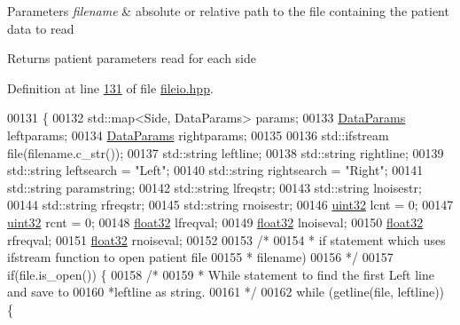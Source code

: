 \begin{DoxyParams}{Parameters}
{\em filename} & absolute or relative path to the file containing the patient data to read\\
\hline
\end{DoxyParams}
\begin{DoxyReturn}{Returns}
patient parameters read for each side 
\end{DoxyReturn}


Definition at line \hyperlink{fileio_8hpp_source_l00131}{131} of file \hyperlink{fileio_8hpp_source}{fileio.\+hpp}.


\begin{DoxyCode}
00131                                                        \{
00132         std::map<Side, DataParams> params;
00133         \hyperlink{structDataParams}{DataParams} leftparams;
00134         \hyperlink{structDataParams}{DataParams} rightparams;
00135 
00136         std::ifstream file(filename.c\_str());
00137         std::string leftline;
00138         std::string rightline;
00139         std::string leftsearch = \textcolor{stringliteral}{"Left"};
00140         std::string rightsearch = \textcolor{stringliteral}{"Right"};
00141         std::string paramstring;
00142         std::string lfreqstr;
00143         std::string lnoisestr;
00144         std::string rfreqstr;
00145         std::string rnoisestr;
00146         \hyperlink{definitions_8hpp_a1134b580f8da4de94ca6b1de4d37975e}{uint32} lcnt = 0;
00147         \hyperlink{definitions_8hpp_a1134b580f8da4de94ca6b1de4d37975e}{uint32} rcnt = 0;
00148         \hyperlink{definitions_8hpp_aacdc525d6f7bddb3ae95d5c311bd06a1}{float32} lfreqval;
00149         \hyperlink{definitions_8hpp_aacdc525d6f7bddb3ae95d5c311bd06a1}{float32} lnoiseval;
00150         \hyperlink{definitions_8hpp_aacdc525d6f7bddb3ae95d5c311bd06a1}{float32} rfreqval;
00151         \hyperlink{definitions_8hpp_aacdc525d6f7bddb3ae95d5c311bd06a1}{float32} rnoiseval;
00152 
00153         \textcolor{comment}{/*}
00154 \textcolor{comment}{         * if statement which uses ifstream function to open patient file }
00155 \textcolor{comment}{         * filename)}
00156 \textcolor{comment}{         */}
00157         \textcolor{keywordflow}{if}(file.is\_open()) \{
00158             \textcolor{comment}{/*}
00159 \textcolor{comment}{             * While statement to find the first Left line and save to }
00160 \textcolor{comment}{             *leftline as string.}
00161 \textcolor{comment}{             */}
00162             \textcolor{keywordflow}{while} (getline(file, leftline)) \{

\end{DoxyCode}
